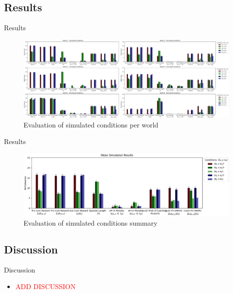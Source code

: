 \documentclass[aspectratio=1610, xcolor=dvipsnames]{packages/beamer}
\newcommand{\add}{\textcolor{red}}
\begin{document}
\subsection{Results}
\begin{frame}{Results}
     \begin{figure} \centering
        \includegraphics[width=0.99\textwidth]{../results/policy_comparisons/Fig_AssumptionComparison}
        \caption{Evaluation of simulated conditions per world}
        \label{fig:PolicyCompWorld}
    \end{figure}
\end{frame}
\begin{frame}{Results}
     \begin{figure} \centering
        \includegraphics[width=0.99\textwidth]{../results/policy_comparisons/Fig_AssumptionComparison_Summary}
        \caption{Evaluation of simulated conditions summary}
        \label{fig:PolicyCompSummary}
    \end{figure}
\end{frame}

\subsection{Discussion}
\begin{frame}{Discussion}
\begin{itemize}
    \item \add{ADD DISCUSSION}
\end{itemize}
\end{frame}

\end{document}
